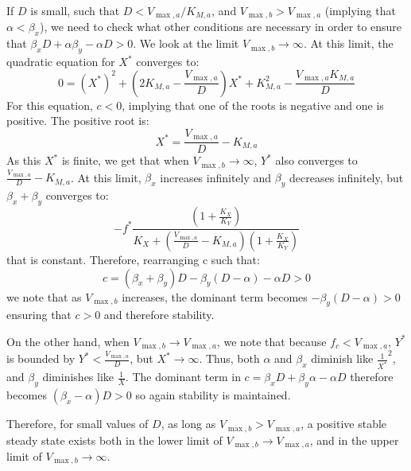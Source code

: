 If $D$ is small, such that $D<V_{\max,a}/K_{M,a}$, and $V_{\max,b}>V_{\max,a}$ (implying that $\alpha<\beta_x$), we need to check what other conditions are necessary in order to ensure that $\beta_x D+\alpha\beta_y-\alpha D >0$.
We look at the limit $V_{\max,b}\rightarrow\infty$.
At this limit, the quadratic equation for $X^*$ converges to:
\begin{equation*}
        0=(X^*)^2+(2K_{M,a}-\frac{V_{\max,a}}{D})X^*+K_{M,a}^2-\frac{V_{\max,a}K_{M,a}}{D}
\end{equation*}
For this equation, $c<0$, implying that one of the roots is negative and one is positive.
The positive root is:
\begin{equation*}
  X^*=\frac{V_{\max,a}}{D}-K_{M,a}
\end{equation*}
As this $X^*$ is finite, we get that when $V_{\max,b}\rightarrow\infty$, $Y^*$ also converges to $\frac{V_{\max,a}}{D}-K_{M,a}$.
At this limit, $\beta_x$ increases infinitely and $\beta_y$ decreases infinitely, but $\beta_x+\beta_y$ converges to:
\begin{equation*}
  -f^*\frac{(1+\frac{K_X}{K_Y})}{K_X+(\frac{V_{\max,a}}{D}-K_{M,a})(1+\frac{K_X}{K_Y})}
\end{equation*}
that is constant.
Therefore, rearranging c such that:
\begin{equation*}
c =(\beta_x+\beta_y) D - \beta_y(D-\alpha)-\alpha D >0
\end{equation*}
we note that as $V_{\max,b}$ increases, the dominant term becomes $-\beta_y(D-\alpha)>0$ ensuring that $c>0$ and therefore stability.

On the other hand, when $V_{\max,b}\rightarrow V_{\max,a}$, we note that because $f_c<V_{\max,a}$, $Y^*$ is bounded by $Y^*<\frac{V_{\max,a}}{D}$, but $X^*\rightarrow \infty$.
Thus, both $\alpha$ and $\beta_x$ diminish like $\frac{1}{X^*}^2$, and $\beta_y$ diminishes like $\frac{1}{X}$.
The dominant term in $c=\beta_x D+\beta_y\alpha-\alpha D$ therefore becomes $(\beta_x-\alpha) D>0$ so again stability is maintained.

Therefore, for small values of $D$, as long as $V_{\max,b}>V_{\max,a}$, a positive stable steady state exists both in the lower limit of $V_{\max,b}\rightarrow V_{\max,a}$, and in the upper limit of $V_{\max,b}\rightarrow\infty$.


